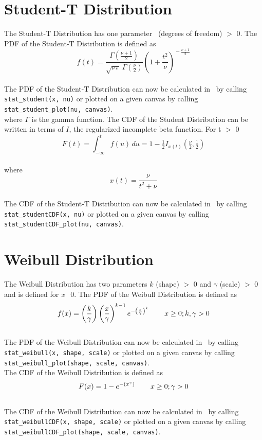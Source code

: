 	\section{Student-T Distribution}
	
		The Student-T Distribution has one parameter \nu\ (degrees of freedom) $>$ 0. The \ac{PDF} of the Student-T Distribution is defined as
		\\
		$$f(t) = \frac{\Gamma(\frac{\nu+1}{2})} {\sqrt{\nu\pi}\,\Gamma(\frac{\nu}{2})} \left(1+\frac{t^2}{\nu} \right)^{\!-\frac{\nu+1}{2}}$$
		\\[0.3cm]
		The \ac{PDF} of the Student-T Distribution can now be calculated in \setlx\ by calling \lstinline{stat_student(x, nu)} or plotted on a given canvas by calling \lstinline{stat_student_plot(nu, canvas)}.
		\\[0.3cm]
		where $\Gamma$ is the gamma function. The \ac{CDF} of the Student Distribution can be written in terms of $I$, the regularized incomplete beta function. For t $>$ 0
		\\
		$$F(t) = \int_{-\infty}^t f(u)\,du = 1 - \tfrac{1}{2} I_{x(t)}\left(\tfrac{\nu}{2}, \tfrac{1}{2}\right)$$
		\\
		where $$x(t) = \frac{\nu}{{t^2+\nu}}$$
		\\[0.3cm]
		The \ac{CDF} of the Student-T Distribution can now be calculated in \setlx\ by calling \lstinline{stat_studentCDF(x, nu)} or plotted on a given canvas by calling \lstinline{stat_studentCDF_plot(nu, canvas)}.
		
	\section{Weibull Distribution}
	
		The Weibull Distribution has two parameters $k$ (shape) $>$ 0 and $\gamma$ (scale) $>$ 0 and is defined for \textit{x} \geq\ 0. The \ac{PDF} of the Weibull Distribution is defined as
		\\
		$$f(x) = \left(\frac{k}{\gamma}\right)\left(\frac{x}{\gamma}\right)^{k-1}e^{-\left(\frac{x}{\gamma}\right)^{k}} \hspace{.3in} x \geq 0; k,\gamma > 0\\$$
		\\[0.3cm]
		The \ac{PDF} of the Weibull Distribution can now be calculated in \setlx\ by calling \lstinline{stat_weibull(x, shape, scale)} or plotted on a given canvas by calling \lstinline{stat_weibull_plot(shape, scale, canvas)}.
		\\[0.3cm]
		The \ac{CDF} of the Weibull Distribution is defined as
		\\
		$$F(x) = 1 - e^{-(x^{\gamma})} \hspace{.3in} x \geq 0; \gamma > 0$$
		\\[0.3cm]
		The \ac{CDF} of the Weibull Distribution can now be calculated in \setlx\ by calling \lstinline{stat_weibullCDF(x, shape, scale)} or plotted on a given canvas by calling \lstinline{stat_weibullCDF_plot(shape, scale, canvas)}.
		